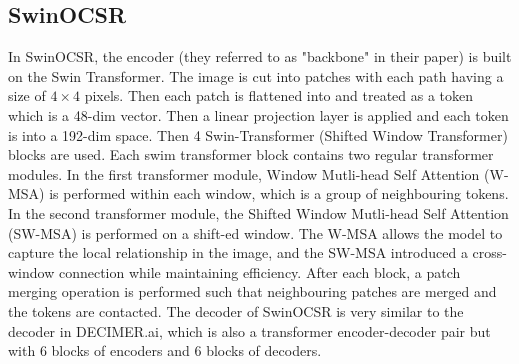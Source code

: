 \documentclass{article}
\begin{document}
\subsection{SwinOCSR}
In SwinOCSR, the encoder (they referred to as "backbone" in their paper) is built on the Swin Transformer. The image is cut into patches with each path having a size of $4 \times 4$ pixels. Then each patch is flattened into and treated as a token which is a 48-dim vector. Then a linear projection layer is applied and each token is into a 192-dim space. 
Then 4 Swin-Transformer (Shifted Window Transformer) \autocite{swin_tran} blocks are used. Each swim transformer block contains two regular transformer modules. In the first transformer module, Window Mutli-head Self Attention (W-MSA) is performed within each window, which is a group of neighbouring tokens. In the second transformer module, the Shifted Window Mutli-head Self Attention (SW-MSA) is performed on a shift-ed window. The W-MSA allows the model to capture the local relationship in the image, and the SW-MSA introduced a cross-window connection while maintaining efficiency. After each block, a patch merging operation is performed such that neighbouring patches are merged and the tokens are contacted. \autocite{swin_tran} The decoder of SwinOCSR is very similar to the decoder in DECIMER.ai, which is also a transformer encoder-decoder pair but with 6 blocks of encoders and 6 blocks of decoders. \cite{swinocsr}




\end{document}
